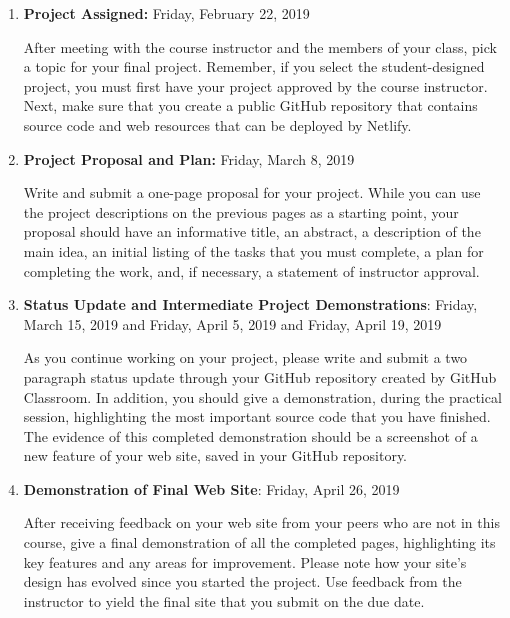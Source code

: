 \documentclass[11pt]{article}
\begin{document}
\vspace*{-.05in}

\begin{enumerate}

  \setlength{\itemsep}{0in}

  \item {\bf Project Assigned:} Friday, February 22, 2019

    After meeting with the course instructor and the members of your class, pick
    a topic for your final project. Remember, if you select the student-designed
    project, you must first have your project approved by the course instructor.
    Next, make sure that you create a public GitHub repository that contains
    source code and web resources that can be deployed by Netlify.

  \item {\bf Project Proposal and Plan:} Friday, March 8, 2019

    Write and submit a one-page proposal for your project. While you can use the
    project descriptions on the previous pages as a starting point, your
    proposal should have an informative title, an abstract, a description of the
    main idea, an initial listing of the tasks that you must complete, a plan
    for completing the work, and, if necessary, a statement of instructor
    approval.

  \item {\bf Status Update and Intermediate Project Demonstrations}: \newline
    Friday, March 15, 2019 and Friday, April 5, 2019 and Friday, April 19, 2019

    As you continue working on your project, please write and submit a two
    paragraph status update through your GitHub repository created by GitHub
    Classroom. In addition, you should give a demonstration, during the
    practical session, highlighting the most important source code that you have
    finished.
    The evidence of this completed demonstration should be a screenshot of a new
    feature of your web site, saved in your GitHub repository.

  \item {\bf Demonstration of Final Web Site}: Friday, April 26, 2019

    After receiving feedback on your web site from your peers who are not in
    this course, give a final demonstration of all the completed pages,
    highlighting its key features and any areas for improvement. Please note how
    your site's design has evolved since you started the project. Use feedback
    from the instructor to yield the final site that you submit on the due date.


\end{enumerate}
\end{document}

